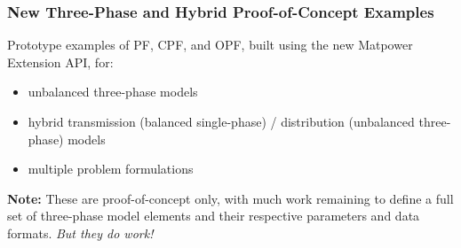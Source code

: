 \documentclass[12pt]{article}
\newcommand{\matpower}[0]{{\sc Matpower}}
\numberwithin{equation}{section}
\numberwithin{table}{section}
\numberwithin{figure}{section}
\begin{document}
\begin{appendices}
\subsubsection*{New Three-Phase and Hybrid Proof-of-Concept Examples}
Prototype examples of PF, CPF, and OPF, built using the new \matpower{} Extension API, for:
\begin{itemize}
\item unbalanced three-phase models
\item hybrid transmission (balanced single-phase) / distribution (unbalanced three-phase) models
\item multiple problem formulations
\end{itemize}
{\bf Note:} These are proof-of-concept only, with much work remaining to define a full set of three-phase model elements and their respective parameters and data formats. \emph{But they do work!}


\end{appendices}
\end{document}
